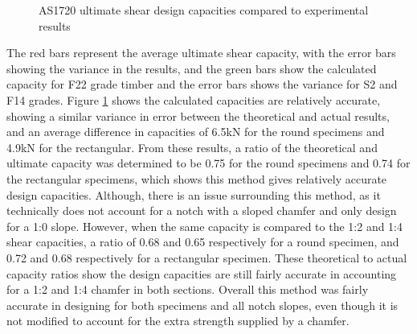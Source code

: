 \documentclass[11pt,a4paper]{article}
\numberwithin{equation}{subsection}
\begin{document}
\begin{figure}[h]
	\begin{center}
	\end{center}
	\caption{AS1720 ultimate shear design capacities compared to experimental results}
	\label{fig:Shear_Des}
\end{figure}

\noindent
The red bars represent the average ultimate shear capacity, with the error bars showing the variance in the results, and the green bars show the calculated capacity for F22 grade timber and the error bars shows the variance for S2 and F14 grades. Figure \ref{fig:Shear_Des} shows the calculated capacities are relatively accurate, showing a similar variance in error between the theoretical and actual results, and an average difference in capacities of 6.5kN for the round specimens and 4.9kN for the rectangular. From these results, a ratio of the theoretical and ultimate capacity was determined to be 0.75 for the round specimens and 0.74 for the rectangular specimens, which shows this method gives relatively accurate design capacities. Although, there is an issue surrounding this method, as it technically does not account for a notch with a sloped chamfer and only design for a 1:0 slope. However, when the same capacity is compared to the 1:2 and 1:4 shear capacities, a ratio of 0.68 and 0.65 respectively for a round specimen, and 0.72 and 0.68 respectively for a rectangular specimen. These theoretical to actual capacity ratios show the design capacities are still fairly accurate in accounting for a 1:2 and 1:4 chamfer in both sections. Overall this method was fairly accurate in designing for both specimens and all notch slopes, even though it is not modified to account for the extra strength supplied by a chamfer. 
\end{document}
